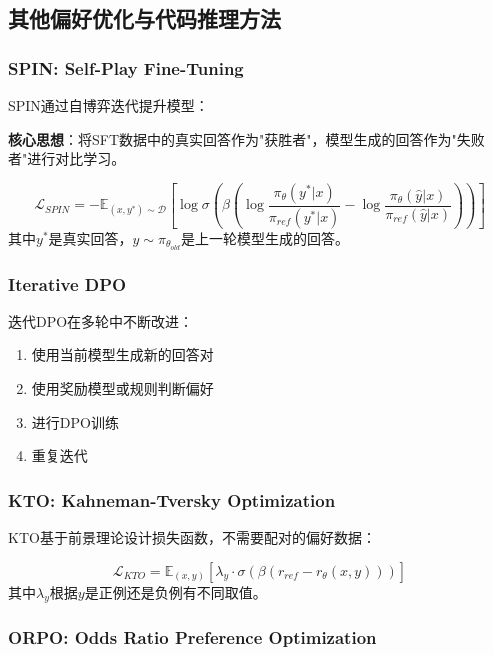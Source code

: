\documentclass[12pt,a4paper]{article}
\begin{document}
\subsection{其他偏好优化与代码推理方法}

\subsubsection{SPIN: Self-Play Fine-Tuning}

SPIN通过自博弈迭代提升模型：

\textbf{核心思想}：将SFT数据中的真实回答作为"获胜者"，模型生成的回答作为"失败者"进行对比学习。

\begin{equation}
\mathcal{L}_{SPIN} = -\mathbb{E}_{(x,y^*) \sim \mathcal{D}}[\log\sigma(\beta(\log\frac{\pi_\theta(y^*|x)}{\pi_{ref}(y^*|x)} - \log\frac{\pi_\theta(\hat{y}|x)}{\pi_{ref}(\hat{y}|x)}))]
\end{equation}
其中$y^*$是真实回答，$\hat{y} \sim \pi_{\theta_{old}}$是上一轮模型生成的回答。

\subsubsection{Iterative DPO}

迭代DPO在多轮中不断改进：
\begin{enumerate}
    \item 使用当前模型生成新的回答对
    \item 使用奖励模型或规则判断偏好
    \item 进行DPO训练
    \item 重复迭代
\end{enumerate}

\subsubsection{KTO: Kahneman-Tversky Optimization}

KTO基于前景理论设计损失函数，不需要配对的偏好数据：

\begin{equation}
\mathcal{L}_{KTO} = \mathbb{E}_{(x,y)}[\lambda_y \cdot \sigma(\beta(r_{ref} - r_\theta(x,y)))]
\end{equation}
其中$\lambda_y$根据$y$是正例还是负例有不同取值。

\subsubsection{ORPO: Odds Ratio Preference Optimization}
\end{document}
